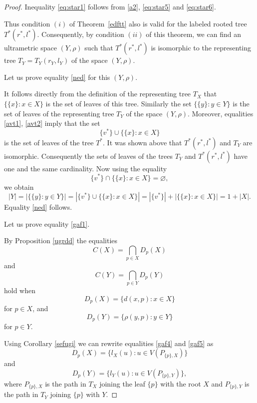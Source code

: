 \documentclass[pdflatex,sn-mathphys-num]{sn-jnl}%
\theoremstyle{thmstyleone}%
\theoremstyle{thmstyletwo}%
\theoremstyle{thmstylethree}%
\theoremstyle{thmstyletwo}%
\theoremstyle{thmstylethree}%
\begin{document}
\begin{proof}
Inequality \eqref{eq:star1} follows from \eqref{a2}, \eqref{eq:star5} and \eqref{eq:star6}.




Thus condition $(i)$ of Theorem~\ref{edftt} also is valid for the labeled rooted tree \(T^*(r^*,l^*)\). Consequently, by condition $(ii)$ of this theorem, we can find an ultrametric space \((Y,\rho)\) such that \(T^*(r^*,l^*)\) is isomorphic to the representing tree $T_Y=T_Y(r_Y,l_Y)$ of the space $(Y,\rho)$.


Let us prove equality \eqref{ned} for this $(Y,\rho)$. 


It follows directly from the 
 definition of the representing tree $T_X$ that $\{\{x\}: x \in X\}$ is the set of leaves of this tree. 
Similarly the set $\{\{y\}: y \in Y\}$ is the set of leaves of the representing tree $T_Y$ of the space $(Y,\rho)$. 
Moreover, equalities \eqref{avt1}, \eqref{avt2} imply that the set
\[
\{v^*\} \cup \{\{x\}: x \in X\}
\]
  is the set of leaves of the tree $T^{*}$.
It was shown above that $T^{*}(r^{*},l^{*})$ and $T_Y$ are isomorphic. 
Consequently the sets of leaves of the trees $T_Y$ and $T^{*}(r^{*},l^{*})$ have one and the same cardinality.
Now using the equality
\[
\{v^*\} \cap \{\{x\}: x \in X\}=\varnothing,
\]
we obtain
\[
|Y|
=
\left|\{\{y\}: y\in Y\}\right|
=
\left|\{v^*\}\cup \{\{x\}: x\in X\}\right|
=
\left|\{v^*\}\right|
+
\left|\{\{x\}: x\in X\}\right|
=
1+|X|.
\]
Equality \eqref{ned} follows.

Let us prove equality \eqref{gaf1}.





By Proposition \ref{ugrdd} the equalities 
\begin{equation}\label{gaf2}
C(X) = \bigcap_{p \in X} D_p(X) 
\end{equation}
and
\begin{equation}\label{gaf3}
C(Y) = \bigcap_{p \in Y} D_p(Y) 
\end{equation}
hold when
\begin{equation}\label{gaf4}
 D_p(X) =\{d(x,p)\colon x\in X\}
\end{equation}
for $p\in X$, and
\begin{equation}\label{gaf5}
 D_p(Y) =\{\rho(y,p)\colon y\in Y\}
\end{equation}
for $p\in Y$.


Using Corollary \ref{sefugi} we can rewrite equalities \eqref{gaf4} and \eqref{gaf5} as
\begin{equation*}
D_p(X) = \{ l_X(u) : u \in V(P_{\{p\},X}) \} 
\end{equation*}
and
\begin{equation*}
D_p(Y) = \{ l_Y(u) : u \in V(P_{\{p\},Y}) \},
\end{equation*}
where \(P_{\{p\},X}\) is the path in \(T_X\) joining the leaf \(\{p\}\) with the root \(X\) and \(P_{\{p\},Y}\) is the path in \(T_Y\) joining \(\{p\}\) with \(Y\).


\end{proof}
\end{document}
